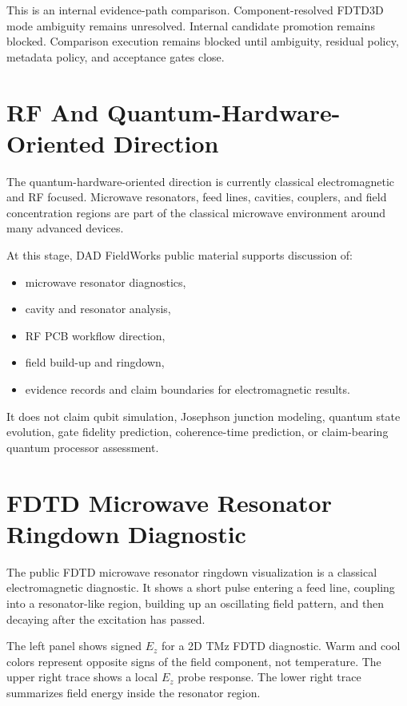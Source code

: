 \documentclass[11pt,a4paper]{article}
\begin{document}
This is an internal evidence-path comparison. Component-resolved FDTD3D mode ambiguity remains unresolved. Internal candidate promotion remains blocked. Comparison execution remains blocked until ambiguity, residual policy, metadata policy, and acceptance gates close.

\section{RF And Quantum-Hardware-Oriented Direction}
\label{sec:rf-quantum-direction}

The quantum-hardware-oriented direction is currently classical electromagnetic and RF focused. Microwave resonators, feed lines, cavities, couplers, and field concentration regions are part of the classical microwave environment around many advanced devices.

At this stage, DAD FieldWorks public material supports discussion of:

\begin{itemize}
  \item microwave resonator diagnostics,
  \item cavity and resonator analysis,
  \item RF PCB workflow direction,
  \item field build-up and ringdown,
  \item evidence records and claim boundaries for electromagnetic results.
\end{itemize}

It does not claim qubit simulation, Josephson junction modeling, quantum state evolution, gate fidelity prediction, coherence-time prediction, or claim-bearing quantum processor assessment.

\section{FDTD Microwave Resonator Ringdown Diagnostic}
\label{sec:fdtd-resonator-ringdown}

The public FDTD microwave resonator ringdown visualization is a classical electromagnetic diagnostic. It shows a short pulse entering a feed line, coupling into a resonator-like region, building up an oscillating field pattern, and then decaying after the excitation has passed.

The left panel shows signed \(E_z\) for a 2D TMz FDTD diagnostic. Warm and cool colors represent opposite signs of the field component, not temperature. The upper right trace shows a local \(E_z\) probe response. The lower right trace summarizes field energy inside the resonator region.
\end{document}
